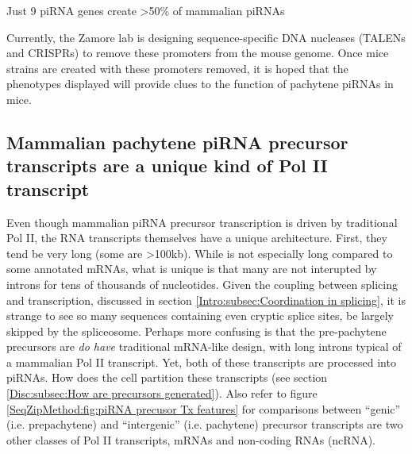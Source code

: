     \begin{table} %
      \caption{Just 9 piRNA genes create >50\% of mammalian piRNAs}
      \label{SeqZipMethod:tab:matchedClusterValues}
      \end{table}
    

    Currently, the Zamore lab is designing sequence-specific DNA nucleases (TALENs and CRISPRs) to remove these promoters from the mouse genome. Once mice strains are created with these promoters removed, it is hoped that the phenotypes displayed will provide clues to the function of pachytene piRNAs in mice.

  \subsection{Mammalian pachytene piRNA precursor transcripts are a unique kind of Pol II transcript}
    \label{SeqZipMethod:subsec:pachytene Tx are different}

    Even though mammalian piRNA precursor transcription is driven by traditional Pol II, the RNA transcripts themselves have a unique architecture. First, they tend be very long (some are >100kb). While is not especially long compared to some annotated mRNAs, what is unique is that many are not interupted by introns for tens of thousands of nucleotides. Given the coupling between splicing and transcription, discussed in section \ref{Intro:subsec:Coordination in splicing}, it is strange to see so many sequences containing even cryptic splice sites, be largely skipped by the spliceosome. Perhaps more confusing is that the pre-pachytene precursors are \textit{do have} traditional mRNA-like design, with long introns typical of a mammalian Pol II transcript. Yet, both of these transcripts are processed into piRNAs. How does the cell partition these transcripts (see section \ref{Disc:subsec:How are precursors generated}). Also refer to figure \ref{SeqZipMethod:fig:piRNA precusor Tx features} for comparisons between ``genic'' (i.e. prepachytene) and ``intergenic'' (i.e. pachytene) precursor transcripts are two other classes of Pol II transcripts, mRNAs and non-coding RNAs (ncRNA).

